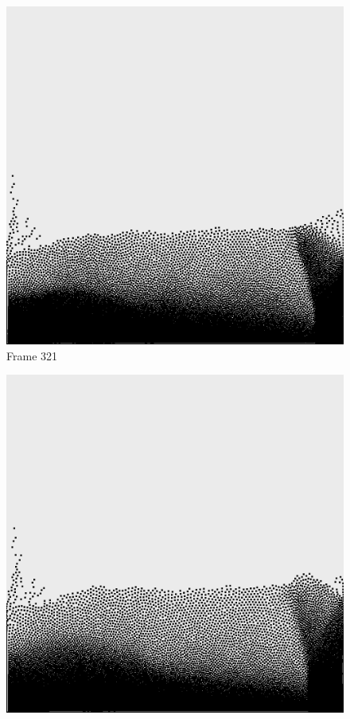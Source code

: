\documentclass[a4paper, 12pt, oneside]{book}
\begin{document}
\begin{figure}[!ht]
    \addvspace{0.5ex}
        \begin{center}
            \includegraphics[width=\linewidth]{images/test_case_2/321.png}
            Frame 321
        \end{center}
    \endminipage
    \hfill
        \begin{center}
            \includegraphics[width=\linewidth]{images/test_case_2/341.png}

\end{center}
\end{figure}
\end{document}
